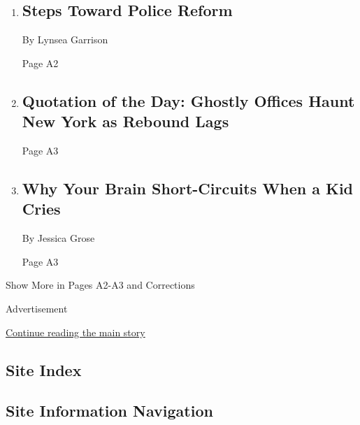 \begin{enumerate}
\def\labelenumi{\arabic{enumi}.}
\item
  \href{/2020/09/04/podcasts/daily-newsletter-police-reform-belarus.html}{}

  \hypertarget{steps-toward-police-reform}{%
  \subsection{Steps Toward Police
  Reform}\label{steps-toward-police-reform}}

  By Lynsea Garrison

  Page A2
\item
  \href{/2020/09/08/todayspaper/quotation-of-the-day-ghostly-offices-haunt-new-york-as-rebound-lags.html}{}

  \hypertarget{quotation-of-the-day-ghostly-offices-haunt-new-york-as-rebound-lags}{%
  \subsection{Quotation of the Day: Ghostly Offices Haunt New York as
  Rebound
  Lags}\label{quotation-of-the-day-ghostly-offices-haunt-new-york-as-rebound-lags}}

  Page A3
\item
  \href{/2020/08/12/parenting/kid-crying-response.html}{}

  \hypertarget{why-your-brain-short-circuits-when-a-kid-cries}{%
  \subsection{Why Your Brain Short-Circuits When a Kid
  Cries}\label{why-your-brain-short-circuits-when-a-kid-cries}}

  By Jessica Grose

  Page A3
\end{enumerate}

Show More in Pages A2-A3 and Corrections

Advertisement

\protect\hyperlink{after-mid6}{Continue reading the main story}

\hypertarget{site-index}{%
\subsection{Site Index}\label{site-index}}

\hypertarget{site-information-navigation}{%
\subsection{Site Information
Navigation}\label{site-information-navigation}}

